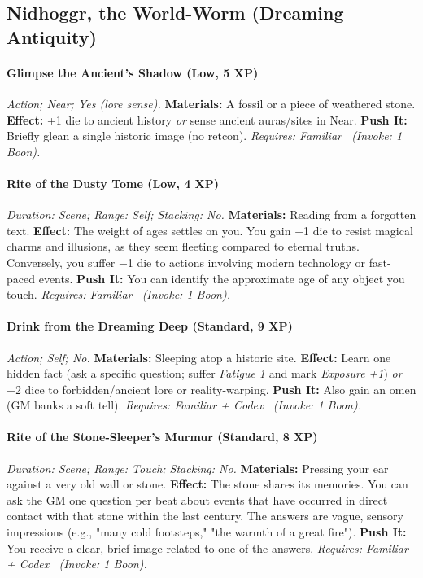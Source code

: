 \documentclass[12pt,twoside]{book}
\begin{document}
\subsection{Nidhoggr, the World-Worm (Dreaming Antiquity)}
\paragraph{Glimpse the Ancient’s Shadow (Low, 5 XP)} \emph{Action; Near; Yes (lore sense).}
\textbf{Materials:} A fossil or a piece of weathered stone.
\textbf{Effect:} +1 die to ancient history \emph{or} sense ancient auras/sites in Near.
\textbf{Push It:} Briefly glean a single historic image (no retcon).
\emph{Requires: Familiar \ (\textit{Invoke:} 1 Boon).}
\paragraph{Rite of the Dusty Tome (Low, 4 XP)} \emph{Duration: Scene; Range: Self; Stacking: No.}
\textbf{Materials:} Reading from a forgotten text.
\textbf{Effect:} The weight of ages settles on you. You gain +1 die to resist magical charms and illusions, as they seem fleeting compared to eternal truths. Conversely, you suffer −1 die to actions involving modern technology or fast-paced events.
\textbf{Push It:} You can identify the approximate age of any object you touch.
\emph{Requires: Familiar \ (\textit{Invoke:} 1 Boon).}
\paragraph{Drink from the Dreaming Deep (Standard, 9 XP)} \emph{Action; Self; No.}
\textbf{Materials:} Sleeping atop a historic site.
\textbf{Effect:} Learn one hidden fact (ask a specific question; suffer \emph{Fatigue 1} and mark \emph{Exposure +1}) \emph{or} +2 dice to forbidden/ancient lore or reality-warping.
\textbf{Push It:} Also gain an omen (GM banks a soft tell).
\emph{Requires: Familiar + Codex \ (\textit{Invoke:} 1 Boon).}
\paragraph{Rite of the Stone-Sleeper's Murmur (Standard, 8 XP)} \emph{Duration: Scene; Range: Touch; Stacking: No.}
\textbf{Materials:} Pressing your ear against a very old wall or stone.
\textbf{Effect:} The stone shares its memories. You can ask the GM one question per beat about events that have occurred in direct contact with that stone within the last century. The answers are vague, sensory impressions (e.g., "many cold footsteps," "the warmth of a great fire").
\textbf{Push It:} You receive a clear, brief image related to one of the answers.
\emph{Requires: Familiar + Codex \ (\textit{Invoke:} 1 Boon).}
\end{document}
